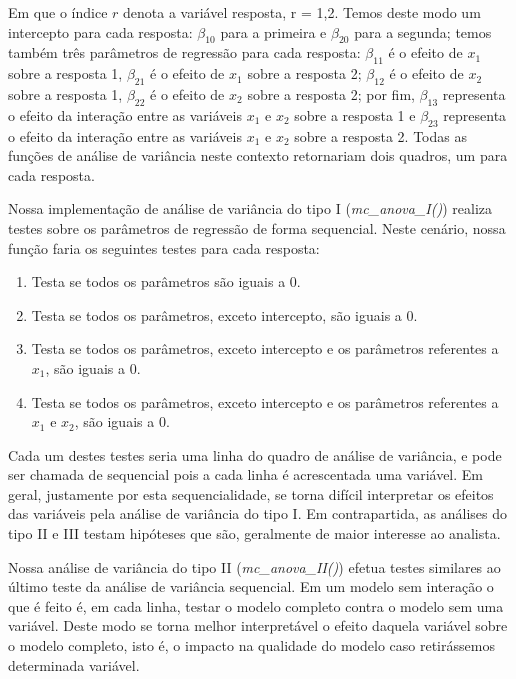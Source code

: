 \noindent Em que o índice $r$ denota a variável resposta, r = 1,2. Temos deste modo um intercepto para cada resposta: $\beta_{10}$ para a primeira e $\beta_{20}$ para a segunda; temos também três parâmetros de regressão para cada resposta: $\beta_{11}$ é o efeito de $x_1$ sobre a resposta 1, $\beta_{21}$ é o efeito de $x_1$ sobre a resposta 2; $\beta_{12}$ é o efeito de $x_2$ sobre a resposta 1, $\beta_{22}$ é o efeito de $x_2$ sobre a resposta 2; por fim, $\beta_{13}$ representa o efeito da interação entre as variáveis $x_1$ e $x_2$ sobre a resposta 1 e $\beta_{23}$ representa o efeito da interação entre as variáveis $x_1$ e $x_2$ sobre a resposta 2. Todas as funções de análise de variância neste contexto retornariam dois quadros, um para cada resposta.

Nossa implementação de análise de variância do tipo I (\emph{mc\_anova\_I()}) realiza testes sobre os parâmetros de regressão de forma sequencial. Neste cenário, nossa função faria os seguintes testes para cada resposta:

\begin{enumerate}
  \item Testa se todos os parâmetros são iguais a 0.
  \item Testa se todos os parâmetros, exceto intercepto, são iguais a 0.
  \item Testa se todos os parâmetros, exceto intercepto e os parâmetros referentes a $x_1$, são iguais a 0.
  \item Testa se todos os parâmetros, exceto intercepto e os parâmetros referentes a $x_1$ e $x_2$, são iguais a 0.
\end{enumerate}

Cada um destes testes seria uma linha do quadro de análise de variância, e pode ser chamada de sequencial pois a cada linha é acrescentada uma variável. Em geral, justamente por esta sequencialidade, se torna difícil interpretar os efeitos das variáveis pela análise de variância do tipo I. Em contrapartida, as análises do tipo II e III testam hipóteses que são, geralmente de maior interesse ao analista.

Nossa análise de variância do tipo II (\emph{mc\_anova\_II()}) efetua testes similares ao último teste da análise de variância sequencial. Em um modelo sem interação o que é feito é, em cada linha, testar o modelo completo contra o modelo sem uma variável. Deste modo se torna melhor interpretável o efeito daquela variável sobre o modelo completo, isto é, o impacto na qualidade do modelo caso retirássemos determinada variável.

